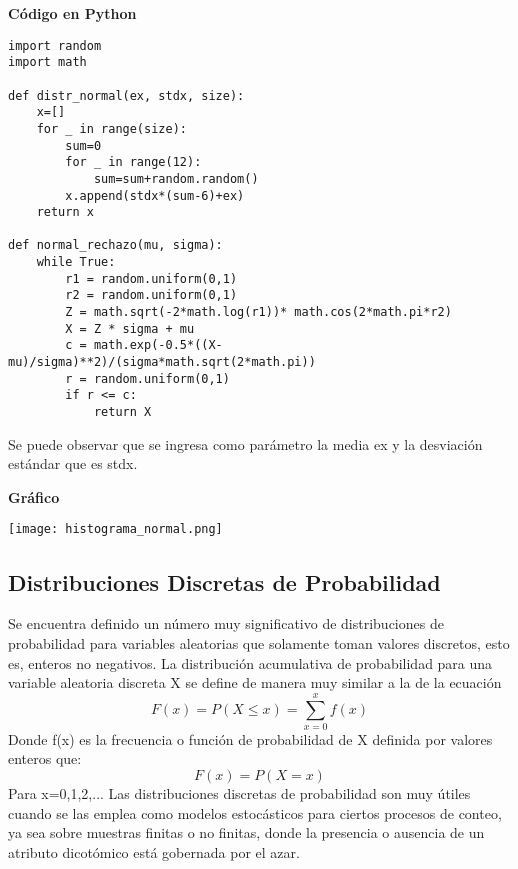 \documentclass[11pt]{article}
\begin{document}
\noindent\textbf{Código en Python}\\

\begin{lstlisting}
import random
import math

def distr_normal(ex, stdx, size):
    x=[]
    for _ in range(size):
        sum=0
        for _ in range(12):
            sum=sum+random.random()
        x.append(stdx*(sum-6)+ex)
    return x

def normal_rechazo(mu, sigma):
    while True:
        r1 = random.uniform(0,1)
        r2 = random.uniform(0,1)
        Z = math.sqrt(-2*math.log(r1))* math.cos(2*math.pi*r2)
        X = Z * sigma + mu 
        c = math.exp(-0.5*((X-mu)/sigma)**2)/(sigma*math.sqrt(2*math.pi))
        r = random.uniform(0,1)
        if r <= c:
            return X
\end{lstlisting}
Se puede observar que se ingresa como parámetro la media ex y la desviación estándar que es stdx.

\noindent\textbf{Gráfico}\\

\begin{center}
\texttt{[image: histograma\_normal.png]}
\end{center}


\subsection{Distribuciones Discretas de Probabilidad}
Se encuentra definido un número muy significativo de distribuciones de probabilidad para variables aleatorias que solamente toman valores discretos, esto es, enteros no negativos. La distribución acumulativa de probabilidad para una variable aleatoria discreta X se define de manera muy similar a la de la ecuación
\begin{equation}
F(x) = P(X \leq x) = \sum_{x=0}^{x}f(x)
\end{equation}
Donde f(x) es la frecuencia o función de probabilidad de X definida por valores enteros que:
\begin{equation}
F(x) = P(X= x)
\end{equation}
Para x=0,1,2,...
Las distribuciones discretas de probabilidad son muy útiles cuando se las emplea como modelos estocásticos para ciertos procesos de conteo, ya sea sobre muestras finitas o no finitas, donde la presencia o ausencia de un atributo dicotómico está gobernada por el azar.
\end{document}
